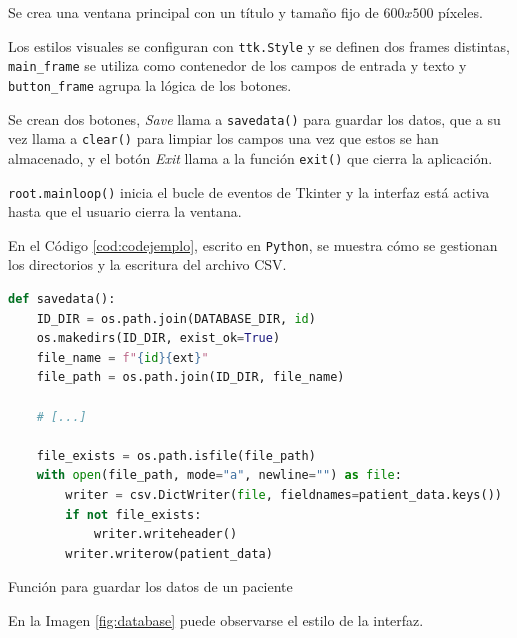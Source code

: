 Se crea una ventana principal con un título y tamaño fijo de $600x500$ píxeles.

Los estilos visuales se configuran con \verb|ttk.Style| y se definen dos frames distintas, \verb|main_frame| se utiliza como contenedor de los campos de entrada y texto y \verb|button_frame| agrupa la lógica de los botones.

Se crean dos botones, \textit{Save} llama a \verb|savedata()| para guardar los datos, que a su vez llama a \verb|clear()| para limpiar los campos una vez que estos se han almacenado, y el botón \textit{Exit} llama a la función \verb|exit()| que cierra la aplicación.

\verb|root.mainloop()| inicia el bucle de eventos de Tkinter y la interfaz está activa hasta que el usuario cierra la ventana.

En el Código \ref{cod:codejemplo}, escrito en \texttt{Python}, se muestra cómo se gestionan los directorios y la escritura del archivo CSV.

\begin{code}[h]
\begin{lstlisting}[language=Python]
def savedata():
    ID_DIR = os.path.join(DATABASE_DIR, id)
    os.makedirs(ID_DIR, exist_ok=True)
    file_name = f"{id}{ext}"
    file_path = os.path.join(ID_DIR, file_name)

    # [...]

    file_exists = os.path.isfile(file_path)
    with open(file_path, mode="a", newline="") as file:
        writer = csv.DictWriter(file, fieldnames=patient_data.keys())
        if not file_exists:
            writer.writeheader()
        writer.writerow(patient_data)
\end{lstlisting}
\caption[Función para guardar los datos de un paciente]{Función para guardar los datos de un paciente}
\label{cod:codejemplo}
\end{code}

En la Imagen \ref{fig:database} puede observarse el estilo de la interfaz.

